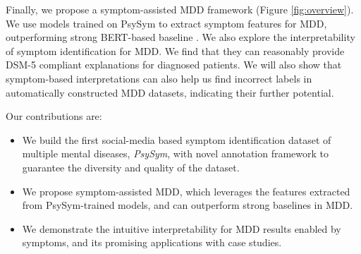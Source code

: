 Finally, we propose a symptom-assisted MDD framework (Figure \ref{fig:overview}). We use models trained on PsySym to extract symptom features for MDD, outperforming strong BERT-based baseline \citep{devlin2018bert}. We also explore the interpretability of symptom identification for MDD. We find that they can reasonably provide DSM-5 compliant explanations for diagnosed patients. We will also show that symptom-based interpretations can also help us find incorrect labels in automatically constructed MDD datasets, indicating their further potential. 

Our contributions are:
\begin{itemize}
    \item We build the first social-media based symptom identification dataset of multiple mental diseases, \textit{PsySym}, with novel annotation framework to guarantee the diversity and quality of the dataset.
    \item We propose symptom-assisted MDD, which leverages the features extracted from PsySym-trained models, and can outperform strong baselines in MDD.
    \item We demonstrate the intuitive interpretability for MDD results enabled by symptoms, and its promising applications with case studies. 
\end{itemize}
